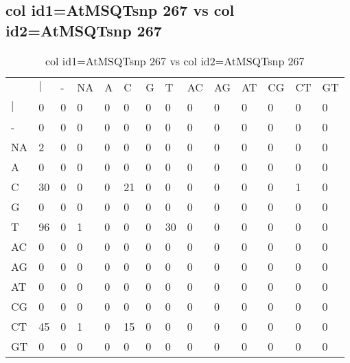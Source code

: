 \subsection{col id1=AtMSQTsnp 267 vs col id2=AtMSQTsnp 267}
\begin{center}
\begin{longtable}{|l|l|l|l|l|l|l|l|l|l|l|l|l|l|}
\caption{col id1=AtMSQTsnp 267 vs col id2=AtMSQTsnp 267} \label{table_dm610}\\
\hline
\\
\hline
&$|$&-&NA&A&C&G&T&AC&AG&AT&CG&CT&GT\\
$|$&0&0&0&0&0&0&0&0&0&0&0&0&0\\
-&0&0&0&0&0&0&0&0&0&0&0&0&0\\
NA&2&0&0&0&0&0&0&0&0&0&0&0&0\\
A&0&0&0&0&0&0&0&0&0&0&0&0&0\\
C&30&0&0&0&21&0&0&0&0&0&0&1&0\\
G&0&0&0&0&0&0&0&0&0&0&0&0&0\\
T&96&0&1&0&0&0&30&0&0&0&0&0&0\\
AC&0&0&0&0&0&0&0&0&0&0&0&0&0\\
AG&0&0&0&0&0&0&0&0&0&0&0&0&0\\
AT&0&0&0&0&0&0&0&0&0&0&0&0&0\\
CG&0&0&0&0&0&0&0&0&0&0&0&0&0\\
CT&45&0&1&0&15&0&0&0&0&0&0&0&0\\
GT&0&0&0&0&0&0&0&0&0&0&0&0&0\\
\hline
\end{longtable}
\end{center}

